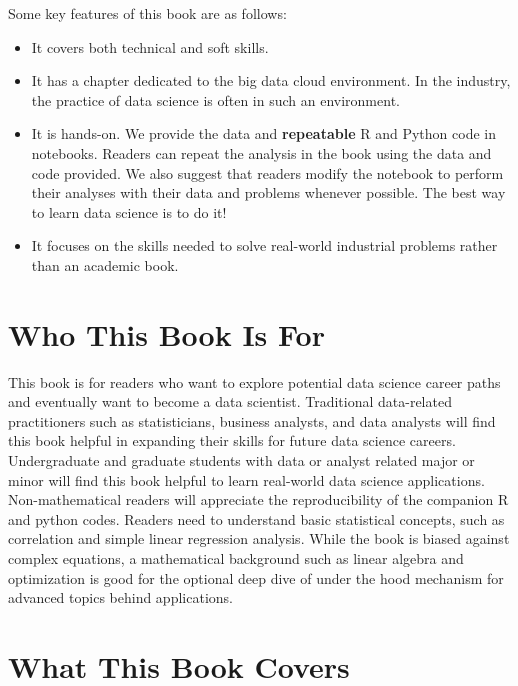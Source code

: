 \documentclass[12pt,]{krantz}
\begin{document}
Some key features of this book are as follows:

\begin{itemize}
\item
  It covers both technical and soft skills.
\item
  It has a chapter dedicated to the big data cloud environment. In the industry, the practice of data science is often in such an environment.
\item
  It is hands-on. We provide the data and \textbf{repeatable} R and Python code in notebooks. Readers can repeat the analysis in the book using the data and code provided. We also suggest that readers modify the notebook to perform their analyses with their data and problems whenever possible. The best way to learn data science is to do it!
\item
  It focuses on the skills needed to solve real-world industrial problems rather than an academic book.
\end{itemize}

\hypertarget{who-this-book-is-for}{%
\section*{Who This Book Is For}\label{who-this-book-is-for}}


This book is for readers who want to explore potential data science career paths and eventually want to become a data scientist. Traditional data-related practitioners such as statisticians, business analysts, and data analysts will find this book helpful in expanding their skills for future data science careers. Undergraduate and graduate students with data or analyst related major or minor will find this book helpful to learn real-world data science applications. Non-mathematical readers will appreciate the reproducibility of the companion R and python codes. Readers need to understand basic statistical concepts, such as correlation and simple linear regression  analysis. While the book is biased against complex equations, a mathematical background such as linear algebra and optimization is good for the optional deep dive of under the hood mechanism for advanced topics behind applications.

\hypertarget{what-this-book-covers}{%
\section*{What This Book Covers}\label{what-this-book-covers}}
\end{document}
